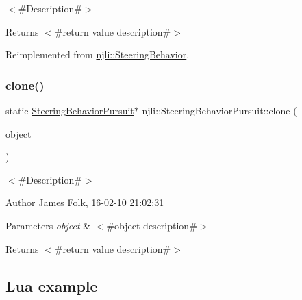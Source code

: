 $<$\#\+Description\#$>$

\begin{DoxyReturn}{Returns}
$<$\#return value description\#$>$ 
\end{DoxyReturn}


Reimplemented from \mbox{\hyperlink{classnjli_1_1_steering_behavior_abbc461d853c1b225cfde5b79d96d11bd}{njli\+::\+Steering\+Behavior}}.

\mbox{\label{classnjli_1_1_steering_behavior_pursuit_a8d2ade5faa2fa7dfc18470fd020902c6}} 
\subsubsection{\texorpdfstring{clone()}{clone()}}
{\footnotesize\ttfamily static \mbox{\hyperlink{classnjli_1_1_steering_behavior_pursuit}{Steering\+Behavior\+Pursuit}}$\ast$ njli\+::\+Steering\+Behavior\+Pursuit\+::clone (\begin{DoxyParamCaption}\item[{const \mbox{\hyperlink{classnjli_1_1_steering_behavior_pursuit}{Steering\+Behavior\+Pursuit}} \&}]{object }\end{DoxyParamCaption})\hspace{0.3cm}{\ttfamily [static]}}



$<$\#\+Description\#$>$ 

\begin{DoxyAuthor}{Author}
James Folk, 16-\/02-\/10 21\+:02\+:31
\end{DoxyAuthor}

\begin{DoxyParams}{Parameters}
{\em object} & $<$\#object description\#$>$\\
\hline
\end{DoxyParams}
\begin{DoxyReturn}{Returns}
$<$\#return value description\#$>$
\end{DoxyReturn}
\hypertarget{classnjli_1_1_steering_behavior_wander_ex1}{}\subsection{Lua example}\label{classnjli_1_1_steering_behavior_wander_ex1}

